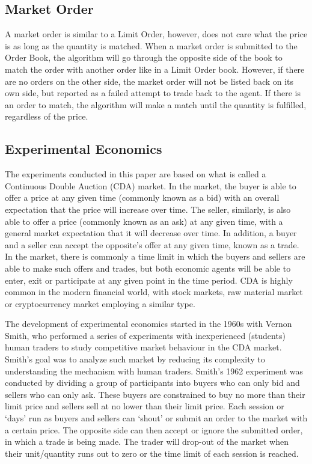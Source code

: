 \documentclass{article}
\begin{document}
\subsection{Market Order}
A market order is similar to a Limit Order, however, does not care what the price is as long as the quantity is matched. When a market order is submitted to the Order Book, the algorithm will go through the opposite side of the book to match the order with another order like in a Limit Order book. However, if there are no orders on the other side, the market order will not be listed back on its own side, but reported as a failed attempt to trade back to the agent. If there is an order to match, the algorithm will make a match until the quantity is fulfilled, regardless of the price. 

\subsection{Experimental Economics}
The experiments conducted in this paper are based on what is called a Continuous Double Auction (CDA) market. In the market, the buyer is able to offer a price at any given time (commonly known as a bid) with an overall expectation that the price will increase over time. The seller, similarly, is also able to offer a price (commonly known as an ask)  at any given time, with a general market expectation that it will decrease over time. In addition, a buyer and a seller can accept the opposite’s offer at any given time, known as a trade. In the market, there is commonly a time limit in which the buyers and sellers are able to make such offers and trades, but both economic agents will be able to enter, exit or participate at any given point in the time period. CDA is highly common in the modern financial world, with stock markets, raw material market or cryptocurrency market employing a similar type. 

The development of experimental economics started in the 1960s with Vernon Smith, who performed a series of experiments with inexperienced (students) human traders to study competitive market behaviour in the CDA market. Smith’s goal was to analyze such market by reducing its complexity to understanding the mechanism with human traders. Smith’s 1962 experiment was conducted by dividing a group of participants into buyers who can only bid and sellers who can only ask. These buyers are constrained to buy no more than their limit price and sellers sell at no lower than their limit price. Each session or ‘days’ run as buyers and sellers can ‘shout’ or submit an order to the market with a certain price. The opposite side can then accept or ignore the submitted order, in which a trade is being made. The trader will drop-out of the market when their unit/quantity runs out to zero or the time limit of each session is reached. 
\end{document}
